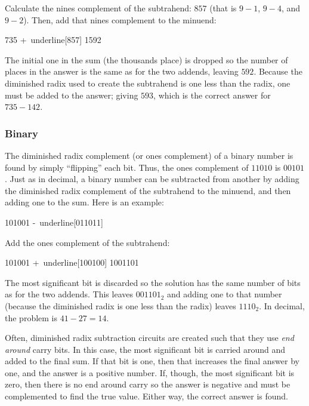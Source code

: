 Calculate the nines complement of the subtrahend: $ 857 $ (that is $ 9-1 $, $ 9-4 $, and $ 9-2 $). Then, add that nines complement to the minuend: 

\begin{binDisp}[commandchars=~\[\]]
      735
     +~underline[857]
     1592
\end{binDisp}

The initial one in the sum (the thousands place) is dropped so the number of places in the answer is the same as for the two addends, leaving $ 592 $. Because the diminished radix used to create the subtrahend is one less than the radix, one must be added to the answer; giving $ 593 $, which is the correct answer for $ 735-142 $.

\subsubsection{Binary}
\label{MO:subsub:binary_subtraction_with_diminished_radix}

The diminished radix complement (or ones complement) of a binary number is found by simply ``flipping'' each bit. Thus, the ones complement of $ 11010 $ is $ 00101 $. Just as in decimal, a binary number can be subtracted from another by adding the diminished radix complement of the subtrahend to the minuend, and then adding one to the sum. Here is an example: 

\begin{binDisp}[commandchars=~\[\]]
      101001
     -~underline[011011]
\end{binDisp}

Add the ones complement of the subtrahend:

\begin{binDisp}[commandchars=~\[\]]
      101001
     +~underline[100100]
     1001101
\end{binDisp}

The most significant bit is discarded so the solution has the same number of bits as for the two addends. This leaves $ 001101_2 $ and adding one to that number (because the diminished radix is one less than the radix) leaves $ 1110_2 $. In decimal, the problem is $ 41-27=14 $.

Often, diminished radix subtraction circuits are created such that they use \emph{end around} carry bits. In this case, the most significant bit is carried around and added to the final sum. If that bit is one, then that increases the final answer by one, and the answer is a positive number. If, though, the most significant bit is zero, then there is no end around carry so the answer is negative and must be complemented to find the true value. Either way, the correct answer is found. 

